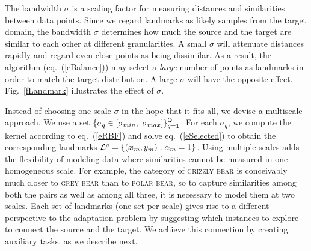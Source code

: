 The bandwidth $\sigma$ is a scaling factor for measuring distances and similarities between data points. Since we regard landmarks as likely samples from the target domain, the bandwidth $\sigma$ determines how much the source and the target are similar to each other at different granularities. A small $\sigma$ will attenuate distances rapidly and regard even close points as being dissimilar. As a result, the algorithm (eq.~(\ref{eBalance})) may select a \emph{large} number of points as landmarks in order to match the target distribution. A large $\sigma$ will have the opposite effect. Fig.~\ref{fLandmark}   illustrates the effect of $\sigma$.

Instead of choosing one scale $\sigma$ in the hope that it fits all, we devise a multiscale approach. We use a set $\{\sigma_q \in [\sigma_{min},\ \sigma_{max}]\}_{q=1}^{\cst{Q}}$. For each $\sigma_q$, we compute the kernel according to eq.~(\ref{eRBF}) and solve eq.~(\ref{eSelected}) to obtain the corresponding landmarks $\mathcal{L}^q = \{ (\boldsymbol{x}_m, y_m):  \alpha_m =1\}$.   Using multiple scales  adds the flexibility of modeling data where similarities cannot be measured in one homogeneous scale.  For example, the category of \textsc{grizzly bear} is conceivably much closer to \textsc{grey bear} than to \textsc{polar bear}, so to capture similarities among both the pairs as well as among all three, it is necessary to model them at two scales. Each set of landmarks (one set per scale) gives rise to a different perspective to the adaptation problem by suggesting which instances to explore to connect the source and the target. We achieve this connection by creating auxiliary tasks, as we describe next.





